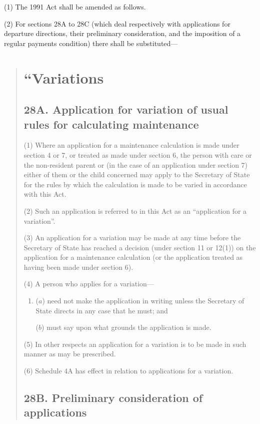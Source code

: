\documentclass[12pt,a4paper]{article}
\begin{document}
(1) The 1991 Act shall be amended as follows.

(2) For sections 28A to 28C (which deal respectively with applications for departure directions, their preliminary consideration, and the imposition of a regular payments condition) there shall be substituted—
\begin{quotation}
\section*{“Variations}

\subsection*{28A. Application for variation of usual rules for calculating maintenance}

(1) Where an application for a maintenance calculation is made under section 4 or 7, or treated as made under section 6, the person with care or the non-resident parent or (in the case of an application under section 7) either of them or the child concerned may apply to the Secretary of State for the rules by which the calculation is made to be varied in accordance with this Act.

(2) Such an application is referred to in this Act as an “application for a variation”.

(3) An application for a variation may be made at any time before the Secretary of State has reached a decision (under section 11 or 12(1)) on the application for a maintenance calculation (or the application treated as having been made under section 6).

(4) A person who applies for a variation—
\begin{enumerate}\item[]
($a$) need not make the application in writing unless the Secretary of State directs in any case that he must; and

($b$) must say upon what grounds the application is made.
\end{enumerate}

(5) In other respects an application for a variation is to be made in such manner as may be prescribed.

(6) Schedule 4A has effect in relation to applications for a variation.

\subsection*{28B. Preliminary consideration of applications}


\end{quotation}
\end{document}
